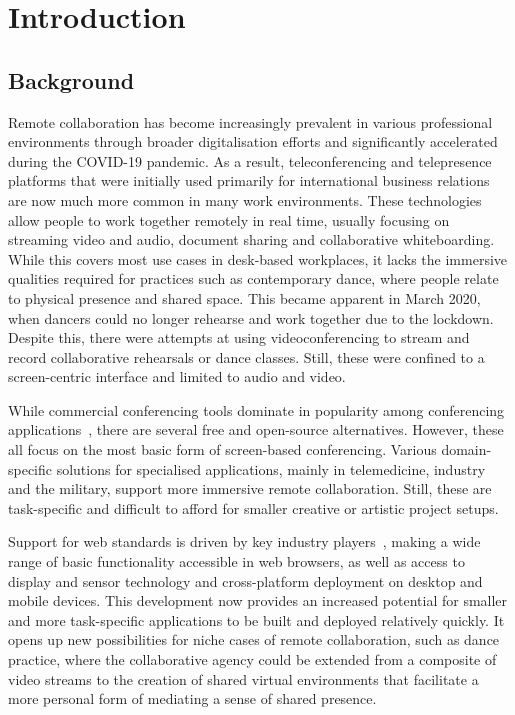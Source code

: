 \chapter{Introduction}
\label{ch:introduction}

\section{Background}
\label{sec:background}

Remote collaboration has become increasingly prevalent in various professional environments through broader digitalisation efforts and significantly accelerated during the COVID-19 pandemic.
As a result, teleconferencing and telepresence platforms that were initially used primarily for international business relations are now much more common in many work environments.
These technologies allow people to work together remotely in real time, usually focusing on streaming video and audio, document sharing and collaborative whiteboarding.
While this covers most use cases in desk-based workplaces, it lacks the immersive qualities required for practices such as contemporary dance, where people relate to physical presence and shared space.
This became apparent in March 2020, when dancers could no longer rehearse and work together due to the lockdown.
Despite this, there were attempts at using videoconferencing to stream and record collaborative rehearsals or dance classes.
Still, these were confined to a screen-centric interface and limited to audio and video.

While commercial conferencing tools dominate in popularity among conferencing applications~\parencite{mostPopularConferencingPlatforms}, there are several free and open-source alternatives.
However, these all focus on the most basic form of screen-based conferencing.
Various domain-specific solutions for specialised applications, mainly in telemedicine, industry and the military, support more immersive remote collaboration.
Still, these are task-specific and difficult to afford for smaller creative or artistic project setups.

Support for web standards is driven by key industry players~\parencite{pushingInteroperabilityForward}, making a wide range of basic functionality accessible in web browsers, as well as access to display and sensor technology and cross-platform deployment on desktop and mobile devices.
This development now provides an increased potential for smaller and more task-specific applications to be built and deployed relatively quickly.
It opens up new possibilities for niche cases of remote collaboration, such as dance practice, where the collaborative agency could be extended from a composite of video streams to the creation of shared virtual environments that facilitate a more personal form of mediating a sense of shared presence.

